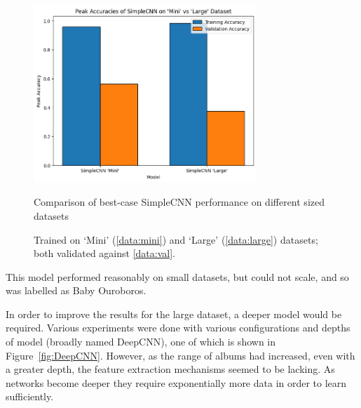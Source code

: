                 \begin{figure}[h]
                    \centering
                    \includegraphics[width=0.75\textwidth]{images/SimpleCNNs_PeakAccuracy.png}
                    \caption{Comparison of best-case SimpleCNN performance on different sized datasets}
                    \label{fig:SimpleCNNs_PeakAccuracy-Mini_Train}
                    \caption*{Trained on `Mini' (\ref{data:mini}) and `Large' (\ref{data:large}) datasets; both validated against \ref{data:val}.}
                \end{figure}
    
                This model performed reasonably on small datasets, but could not scale, and so was labelled as Baby Ouroboros.
    
                In order to improve the results for the large dataset, a deeper model would be required. Various experiments were done with various configurations and depths of model (broadly named DeepCNN), one of which is shown in Figure~\ref{fig:DeepCNN}. However, as the range of albums had increased, even with a greater depth, the feature extraction mechanisms seemed to be lacking. As networks become deeper they require exponentially more data in order to learn sufficiently.
    
